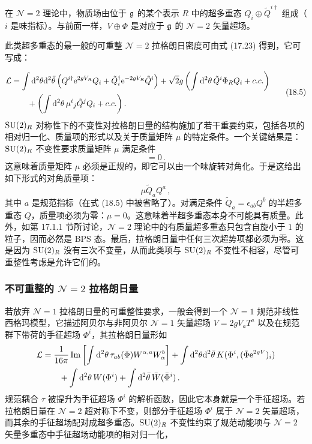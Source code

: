 在 $\mathcal N=2$ 理论中，物质场由位于 $\mathfrak{g}$ 的某个表示 $R$ 中的超多重态 $Q_i\oplus\tilde Q^{i\dagger}$ 组成（$i$ 是味指标）。与前面一样，$V\oplus\Phi$ 是对应于 $\mathfrak{g}$ 的 $\mathcal N=2$ 矢量超场。

\begin{proposition}[18.3]
此类超多重态的最一般的可重整 $\mathcal N=2$ 拉格朗日密度可由式 (17.23) 得到，它可写成：
\end{proposition}

\begin{equation}
\begin{aligned}
\mathcal L&=\int\mathrm{d}^2\theta\mathrm{d}^2\bar\theta\left(Q^{i\dagger}\mathrm{e}^{2gV_R}Q_i+\tilde Q_i^\dagger\mathrm{e}^{-2gV_R}\tilde Q^i\right)
+\sqrt{2}g\left(\int\mathrm{d}^2\theta\,\tilde Q^i\Phi_RQ_i+c.c.\right)\\
&\qquad+\left(\int\mathrm{d}^2\theta\,\mu^i{}_j\tilde Q^jQ_i+c.c.\right).
\end{aligned}
\tag{18.5}
\end{equation}
$\operatorname{SU}(2)_R$ 对称性下的不变性对拉格朗日量的结构施加了若干重要约束，包括各项的相对归一化、质量项的形式以及关于质量矩阵 $\mu$ 的特定条件。一个关键结果是：$\operatorname{SU}(2)_R$ 不变性要求质量矩阵 $\mu$ 满足条件
\begin{equation}
[\mu,\mu^\dagger]=0\,. \tag{18.6}
\end{equation}
这意味着质量矩阵 $\mu$ 必须是正规的，即它可以由一个味旋转对角化。于是这给出如下形式的对角质量项：
\[
\mu\tilde Q_aQ^a\,,
\]
其中 $a$ 是规范指标（在式 (18.5) 中被省略了）。对满足条件 $\tilde Q_a=\epsilon_{ab}Q^b$ 的半超多重态 $Q$，质量项必须为零：$\mu=0$。这意味着半超多重态本身不可能具有质量。此外，如第 17.1.1 节所讨论，$\mathcal N=2$ 理论中的有质量超多重态只包含自旋小于 $1$ 的粒子，因而必然是 BPS 态。最后，拉格朗日量中任何三次超势项都必须为零。这是因为 $\operatorname{SU}(2)_R$ 没有三次不变量，从而此类项与 $\operatorname{SU}(2)_R$ 不变性不相容，尽管可重整性考虑是允许它们的。

\subsubsection*{不可重整的 $\mathcal N=2$ 拉格朗日量}

若放弃 $\mathcal N=1$ 拉格朗日量的可重整性要求，一般会得到一个 $\mathcal N=1$ 规范非线性西格玛模型，它描述阿贝尔与非阿贝尔 $\mathcal N=1$ 矢量超场 $V=2gV_aT^a$ 以及在规范群下带荷的手征超场 $\Phi^i$，其拉格朗日量形如
\[
\begin{aligned}
\mathcal L&=\frac{1}{16\pi}\operatorname{Im}\left[\int\mathrm{d}^2\theta\,\tau_{ab}(\Phi)W^{\alpha,a}W^b_\alpha\right]
+\int\mathrm{d}^2\theta\mathrm{d}^2\bar\theta\,K(\Phi^i,(\bar\Phi \mathrm{e}^{2gV})_i)\\
&\qquad+\int\mathrm{d}^2\theta\,W(\Phi^i)+\int\mathrm{d}^2\bar\theta\,\bar W(\bar\Phi^i)\,.
\end{aligned}
\]
规范耦合 $\tau$ 被提升为手征超场 $\Phi^i$ 的解析函数，因此它本身就是一个手征超场。若拉格朗日量在 $\mathcal N=2$ 超对称下不变，则部分手征超场 $\Phi^i$ 属于 $\mathcal N=2$ 矢量超场，而其余的手征超场配对成超多重态。$\operatorname{SU}(2)_R$ 不变性约束了规范动能项与 $\mathcal N=2$ 矢量多重态中手征超场动能项的相对归一化，

